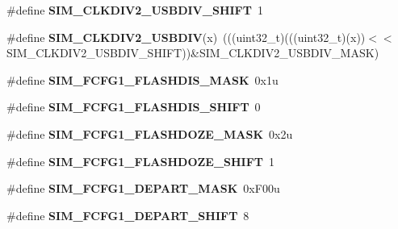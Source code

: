 \begin{DoxyCompactItemize}
\item 
\#define {\bfseries S\+I\+M\+\_\+\+C\+L\+K\+D\+I\+V2\+\_\+\+U\+S\+B\+D\+I\+V\+\_\+\+S\+H\+I\+FT}~1\hypertarget{group__SIM__Register__Masks_gaa085ff25a9d47eecd8a51517fc80778b}{}\label{group__SIM__Register__Masks_gaa085ff25a9d47eecd8a51517fc80778b}

\item 
\#define {\bfseries S\+I\+M\+\_\+\+C\+L\+K\+D\+I\+V2\+\_\+\+U\+S\+B\+D\+IV}(x)~(((uint32\+\_\+t)(((uint32\+\_\+t)(x))$<$$<$S\+I\+M\+\_\+\+C\+L\+K\+D\+I\+V2\+\_\+\+U\+S\+B\+D\+I\+V\+\_\+\+S\+H\+I\+FT))\&S\+I\+M\+\_\+\+C\+L\+K\+D\+I\+V2\+\_\+\+U\+S\+B\+D\+I\+V\+\_\+\+M\+A\+SK)\hypertarget{group__SIM__Register__Masks_ga0b9ec974c8ad543809fa83a73e7883a2}{}\label{group__SIM__Register__Masks_ga0b9ec974c8ad543809fa83a73e7883a2}

\item 
\#define {\bfseries S\+I\+M\+\_\+\+F\+C\+F\+G1\+\_\+\+F\+L\+A\+S\+H\+D\+I\+S\+\_\+\+M\+A\+SK}~0x1u\hypertarget{group__SIM__Register__Masks_gad2bcfe2db5329ab186bb8393228f24cc}{}\label{group__SIM__Register__Masks_gad2bcfe2db5329ab186bb8393228f24cc}

\item 
\#define {\bfseries S\+I\+M\+\_\+\+F\+C\+F\+G1\+\_\+\+F\+L\+A\+S\+H\+D\+I\+S\+\_\+\+S\+H\+I\+FT}~0\hypertarget{group__SIM__Register__Masks_ga1a8408a876a3a68b16780a1d45d539df}{}\label{group__SIM__Register__Masks_ga1a8408a876a3a68b16780a1d45d539df}

\item 
\#define {\bfseries S\+I\+M\+\_\+\+F\+C\+F\+G1\+\_\+\+F\+L\+A\+S\+H\+D\+O\+Z\+E\+\_\+\+M\+A\+SK}~0x2u\hypertarget{group__SIM__Register__Masks_ga5922dc31ee4c05aba3cfeaa4474fddb8}{}\label{group__SIM__Register__Masks_ga5922dc31ee4c05aba3cfeaa4474fddb8}

\item 
\#define {\bfseries S\+I\+M\+\_\+\+F\+C\+F\+G1\+\_\+\+F\+L\+A\+S\+H\+D\+O\+Z\+E\+\_\+\+S\+H\+I\+FT}~1\hypertarget{group__SIM__Register__Masks_ga3f6c60d4baf2c592dbd5c43974bd19f3}{}\label{group__SIM__Register__Masks_ga3f6c60d4baf2c592dbd5c43974bd19f3}

\item 
\#define {\bfseries S\+I\+M\+\_\+\+F\+C\+F\+G1\+\_\+\+D\+E\+P\+A\+R\+T\+\_\+\+M\+A\+SK}~0x\+F00u\hypertarget{group__SIM__Register__Masks_ga7b4c8f63810498cd22002a2f3b1bdc0d}{}\label{group__SIM__Register__Masks_ga7b4c8f63810498cd22002a2f3b1bdc0d}

\item 
\#define {\bfseries S\+I\+M\+\_\+\+F\+C\+F\+G1\+\_\+\+D\+E\+P\+A\+R\+T\+\_\+\+S\+H\+I\+FT}~8\hypertarget{group__SIM__Register__Masks_ga828f3d67b0fb411b1f32f5ac8105964f}{}\label{group__SIM__Register__Masks_ga828f3d67b0fb411b1f32f5ac8105964f}


\end{DoxyCompactItemize}
